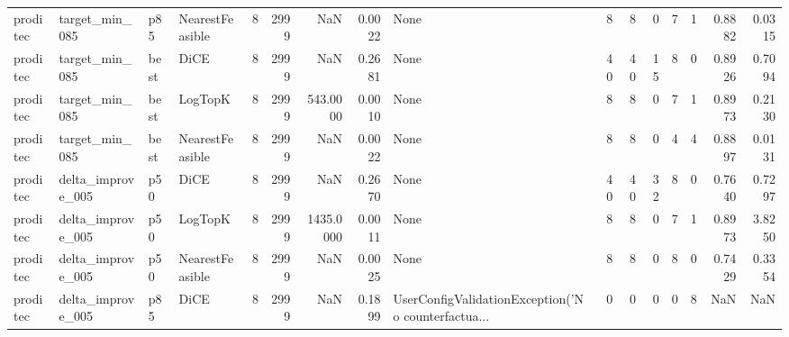 \begin{tabular}{llllrrrrlrrrrrrr}
proditec &       target\_min\_085 &    p85 & NearestFeasible &            8 &                 2999 &                      NaN &      0.0022 &                                               None &      8 &            8 &        0 &              7 &          1 &             0.8882 &         0.0315 \\
proditec &       target\_min\_085 &   best &            DiCE &            8 &                 2999 &                      NaN &      0.2681 &                                               None &     40 &           40 &       15 &              8 &          0 &             0.8926 &         0.7094 \\
proditec &       target\_min\_085 &   best &         LogTopK &            8 &                 2999 &                 543.0000 &      0.0010 &                                               None &      8 &            8 &        0 &              7 &          1 &             0.8973 &         0.2130 \\
proditec &       target\_min\_085 &   best & NearestFeasible &            8 &                 2999 &                      NaN &      0.0022 &                                               None &      8 &            8 &        0 &              4 &          4 &             0.8897 &         0.0131 \\
proditec &    delta\_improve\_005 &    p50 &            DiCE &            8 &                 2999 &                      NaN &      0.2670 &                                               None &     40 &           40 &       32 &              8 &          0 &             0.7640 &         0.7297 \\
proditec &    delta\_improve\_005 &    p50 &         LogTopK &            8 &                 2999 &                1435.0000 &      0.0011 &                                               None &      8 &            8 &        0 &              7 &          1 &             0.8973 &         3.8250 \\
proditec &    delta\_improve\_005 &    p50 & NearestFeasible &            8 &                 2999 &                      NaN &      0.0025 &                                               None &      8 &            8 &        0 &              8 &          0 &             0.7429 &         0.3354 \\
proditec &    delta\_improve\_005 &    p85 &            DiCE &            8 &                 2999 &                      NaN &      0.1899 & UserConfigValidationException('No counterfactua... &      0 &            0 &        0 &              0 &          8 &                NaN &            NaN \\

\end{tabular}
